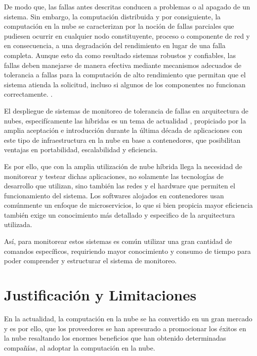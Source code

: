 \par De modo que,  las fallas antes descritas conducen a problemas o al apagado de un sistema. Sin embargo,  la computación distribuida y por consiguiente, la computación en la nube se caracterizan por la noción de fallas parciales que pudiesen ocurrir en cualquier nodo constituyente, proceso o componente de red y en consecuencia, a una degradación del rendimiento en lugar de una falla completa. Aunque esto da como resultado sistemas robustos y confiables, las fallas deben manejarse de manera efectiva mediante mecanismos adecuados de tolerancia a fallas para la computación de alto rendimiento que permitan que el sistema atienda la solicitud, incluso si algunos de los componentes no funcionan correctamente. \cite{PLAN01,PLAN06}.\\

\par  El despliegue de sistemas de monitoreo de tolerancia de fallas en arquitectura de nubes, especifícamente las híbridas es un tema de actualidad \cite{PLAN02}, propiciado por la amplia aceptación e introducción durante la última década de aplicaciones con este tipo de infraestructura en la nube en base a contenedores, que posibilitan ventajas en portabilidad, escalabilidad y eficiencia.\\
 
\par Es por ello, que con la amplia utilización de nube híbrida llega la necesidad de monitorear y testear dichas aplicaciones, no solamente las tecnologías de desarrollo que utilizan, sino también las redes y el hardware que permiten el funcionamiento del sistema. Los softwares alojados en contenedores usan comúnmente un enfoque de microservicios, lo que si bien propicia mayor eficiencia también exige un conocimiento más detallado y especifico de la arquitectura utilizada.\\
\par Así, para monitorear estos sistemas es común utilizar una gran cantidad de comandos específicos, requiriendo mayor conocimiento y consumo de tiempo para poder comprender y estructurar el sistema de monitoreo.
\section{Justificación y Limitaciones}

\par En la actualidad, la computación en la nube se ha convertido en un gran mercado y es por ello, que los proveedores se han apresurado a promocionar los éxitos en la nube resaltando los enormes beneficios que han obtenido determinadas compañías, al adoptar la computación en la nube.\\

